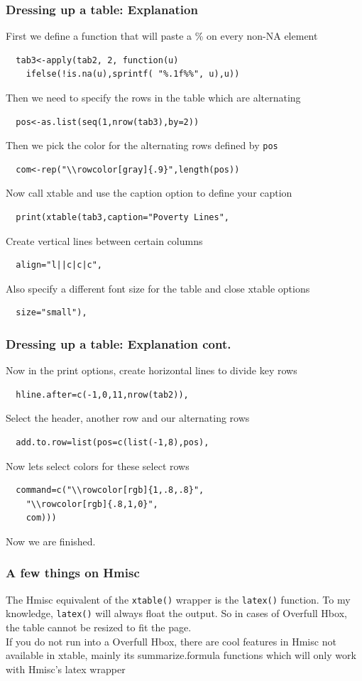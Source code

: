 \documentclass[nogin]{beamer}\usepackage[]{graphicx}\usepackage[]{color}
\begin{document}
\begin{frame}[fragile]
\frametitle{Dressing up a table: Explanation}
\footnotesize
First we define a function that will paste a \% on every non-NA element
\begin{verbatim}
  tab3<-apply(tab2, 2, function(u) 
    ifelse(!is.na(u),sprintf( "%.1f%%", u),u))
\end{verbatim}
Then we need to specify the rows in the table which are alternating
\begin{verbatim}
  pos<-as.list(seq(1,nrow(tab3),by=2))
\end{verbatim}
Then we pick the color for the alternating rows defined by \verb|pos|
\begin{verbatim}
  com<-rep("\\rowcolor[gray]{.9}",length(pos))
\end{verbatim}
Now call xtable and use the caption option to define your caption
\begin{verbatim}
  print(xtable(tab3,caption="Poverty Lines",
\end{verbatim}
Create vertical lines between certain columns
\begin{verbatim}
  align="l||c|c|c",
\end{verbatim}
Also specify a different font size for the table and close xtable options
\begin{verbatim}
  size="small"),
\end{verbatim}
\end{frame}
\begin{frame}[fragile]
\frametitle{Dressing up a table: Explanation cont.}
\footnotesize
Now in the print options, create horizontal lines to divide key rows
\begin{verbatim}
  hline.after=c(-1,0,11,nrow(tab2)),
\end{verbatim}
Select the header, another row and our alternating rows
\begin{verbatim}
  add.to.row=list(pos=c(list(-1,8),pos),
\end{verbatim}
Now lets select colors for these select rows
\begin{verbatim}
  command=c("\\rowcolor[rgb]{1,.8,.8}",
    "\\rowcolor[rgb]{.8,1,0}",
    com)))
\end{verbatim}
Now we are finished.
\end{frame}

\begin{frame}[fragile]
\frametitle{A few things on Hmisc}
The Hmisc equivalent of the \verb|xtable()| wrapper  is the \verb|latex()| function. To my knowledge, \verb|latex()| will always float the output. So in cases of Overfull Hbox, the table cannot be resized to fit the page.\\[\baselineskip]
If you do not run into a Overfull Hbox, there are cool features in Hmisc not available in xtable, mainly its summarize.formula functions which will only work with Hmisc's latex wrapper
\end{frame}
\end{document}
